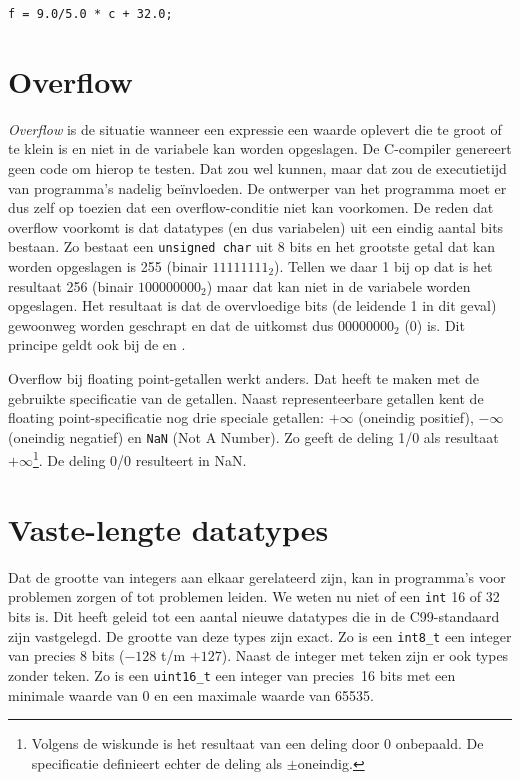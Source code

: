 \begin{lstlisting}[style=lstoneline]
f = 9.0/5.0 * c + 32.0;
\end{lstlisting}
 

\section{Overflow}
\textsl{Overflow} is de situatie wanneer een expressie een waarde oplevert die te groot of te klein is en niet in de variabele kan worden opgeslagen. De C-compiler genereert geen code om hierop te testen. Dat zou wel kunnen, maar dat zou de executietijd van programma's nadelig beïnvloeden. De ontwerper van het programma moet er dus zelf op toezien dat een overflow-conditie niet kan voorkomen. De reden dat overflow voorkomt is dat datatypes (en dus variabelen) uit een eindig aantal bits bestaan. Zo bestaat een \texttt{unsigned char} uit 8 bits en het grootste getal dat kan worden opgeslagen is 255 (binair $11111111_2$). Tellen we daar 1 bij op dat is het resultaat 256 (binair $100000000_2$) maar dat kan niet in de variabele worden opgeslagen. Het resultaat is dat de overvloedige bits (de leidende 1  in dit geval) gewoonweg worden geschrapt en dat de uitkomst dus $00000000_2$ (0) is. Dit principe geldt ook bij de  en .

Overflow bij floating point-getallen werkt anders. Dat heeft te maken met de gebruikte specificatie van de getallen.
Naast representeerbare getallen kent de floating point-specificatie nog drie speciale getallen: $+\infty$ (oneindig positief), $-\infty$ (oneindig negatief) en \texttt{NaN} (Not A Number). Zo geeft de deling 1/0 als resultaat $+\infty$\footnote{Volgens de wiskunde is het resultaat van een deling door 0 onbepaald. De specificatie definieert echter de deling als $\pm$oneindig.}. De deling 0/0 resulteert in NaN.


\section{Vaste-lengte datatypes}
Dat de grootte van integers aan elkaar gerelateerd zijn, kan in programma's voor problemen zorgen of tot problemen leiden. We weten nu niet of een \texttt{int} 16 of 32 bits is. Dit heeft geleid tot een aantal nieuwe datatypes die in de C99-standaard zijn vastgelegd. De grootte van deze types zijn exact. Zo is een \texttt{int8\_t} een integer van precies 8 bits ($-128$ t/m $+127$). Naast de integer met teken zijn er ook types zonder teken. Zo is een \texttt{uint16\_t} een integer van precies~16 bits met een minimale waarde van 0 en een maximale waarde van 65535.

